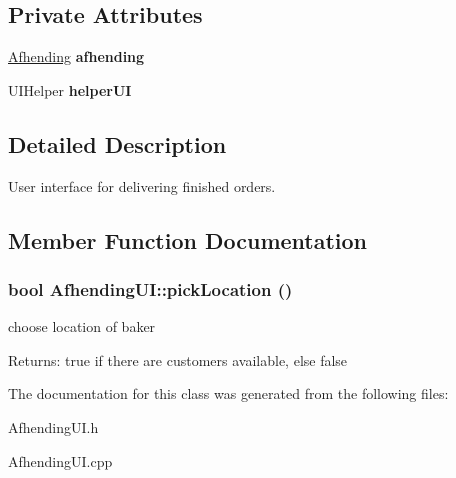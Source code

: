 \subsection*{Private Attributes}
\begin{CompactItemize}
\item 
\hypertarget{class_afhending_u_i_6d54613ddac2c68ed16224a0ac770eb5}{
\hyperlink{class_afhending}{Afhending} {\bf afhending}}
\label{class_afhending_u_i_6d54613ddac2c68ed16224a0ac770eb5}

\item 
\hypertarget{class_afhending_u_i_165ca02db075e280199e0970e3465900}{
UIHelper {\bf helper\-UI}}
\label{class_afhending_u_i_165ca02db075e280199e0970e3465900}

\end{CompactItemize}


\subsection{Detailed Description}
User interface for delivering finished orders. 



\subsection{Member Function Documentation}
\hypertarget{class_afhending_u_i_74d0d6b7d7493e8a9703bc8fbeb79f2e}{
\subsubsection[pickLocation]{\setlength{\rightskip}{0pt plus 5cm}bool Afhending\-UI::pick\-Location ()}}
\label{class_afhending_u_i_74d0d6b7d7493e8a9703bc8fbeb79f2e}


choose location of baker 

\begin{Desc}
\item[Returns:]true if there are customers available, else false \end{Desc}


The documentation for this class was generated from the following files:\begin{CompactItemize}
\item 
Afhending\-UI.h\item 
Afhending\-UI.cpp\end{CompactItemize}

